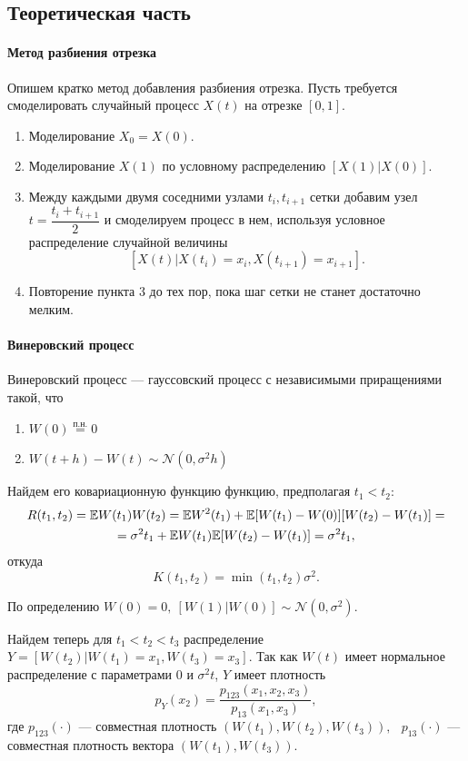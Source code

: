 \documentclass[16pt]{article}
\newcommand\A{(\cdot)}
\begin{document}
\subsection{Теоретическая часть}
\paragraph{Метод разбиения отрезка}
Опишем кратко метод добавления разбиения отрезка. Пусть требуется смоделировать случайный процесс $X(t)$ на отрезке $[0, 1]$. 
\begin{enumerate}
	\item Моделирование $X_0 = X(0)$.
	\item Моделирование $X(1)$ по условному распределению $[X(1)|X(0)]$.
	\item Между каждыми двумя соседними узлами $t_i, t_{i + 1}$ сетки добавим узел $t = \dfrac{t_i + t_{i+1}}{2}$ и смоделируем процесс в нем, используя условное распределение случайной величины $$[X(t)|X(t_{i}) = x_i, X(t_{i+1}) = x_{i+1}].$$
	\item Повторение пункта 3 до тех пор, пока шаг сетки не станет достаточно мелким.
\end{enumerate}

\paragraph{Винеровский процесс}
Винеровский процесс --- гауссовский процесс с независимыми приращениями такой, что
\begin{enumerate}
	\item $W(0) \overset{\text{п.н.}}{=} 0$
	\item $W(t + h) - W(t) \sim \mathcal{N}(0, \sigma^2h)$
\end{enumerate}

Найдем его ковариационную функцию функцию, предполагая $t_1 < t_2$:
\begin{multline}\notag
 R(t_1, t_2) = \mathbb{E}W(t_1)W(t_2) = \mathbb{E}W^2(t_1) + \mathbb{E}[W(t_1) - W(0)][W(t_2) - W(t_1)] =\\= \sigma^2 t_1 + \mathbb{E}W(t_1)\mathbb{E}[W(t_2) - W(t_1)] = \sigma^2 t_1,
\end{multline}
откуда
$$K(t_1, t_2) = \min(t_1, t_2) \sigma^2.$$

По определению $W(0) = 0, \ [W(1)|W(0)] \sim \mathcal{N}(0, \sigma^2)$. 

Найдем теперь для $t_1 < t_2 < t_3$ распределение $Y = [W(t_2)|W(t_1) = x_1, W(t_3) = x_3]$. 
Так как $W(t)$ имеет нормальное распределение с параметрами $0$ и $\sigma^2t$, $Y$ имеет плотность
$$p_Y(x_2) = \dfrac{p_{123}(x_1, x_2, x_3)}{p_{13}(x_1, x_3)},$$
где $p_{123}\A$ --- совместная плотность $(W(t_1), W(t_2), W(t_3)),\ $\ $p_{13}\A$ --- совместная плотность вектора $(W(t_1), W(t_3))$.
\end{document}
